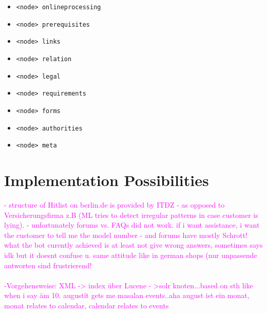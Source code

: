 \begin{itemize}
\begin{itemize}
		\item \lstinline|<node> onlineprocessing|
		\item \lstinline|<node> prerequisites|
		\item \lstinline|<node> links|
		\item \lstinline|<node> relation|
		\item \lstinline|<node> legal|
		\item \lstinline|<node> requirements|
		\item \lstinline|<node> forms|
		\item \lstinline|<node> authorities|
		\item \lstinline|<node> meta|										
	\end{itemize}
\end{itemize}



\section{Implementation Possibilities}

\textcolor{magenta}{
- structure of Hitlist on berlin.de  is provided by ITDZ -  as opposed to Versicherungsfirma z.B (ML tries to detect irregular patterns in case customer is lying).
- unfortunately forums vs. FAQs did not work. if i want assistance, i want the customer to tell me the model number - and forums have mostly Schrott!\\
what the bot curently achieved is at least not give wrong answers, sometimes says idk but it doesnt confuse u. same attitude like in german shops (nur unpassende antworten sind frustrierend!\\
\\
-Vorgehensweise: XML -> index \"uber Lucene - >solr knoten...based on sth like when i say \" am 10. august\" it gets me masalan events..aha august ist ein monat, monat relates to calendar, calendar relates to events
}